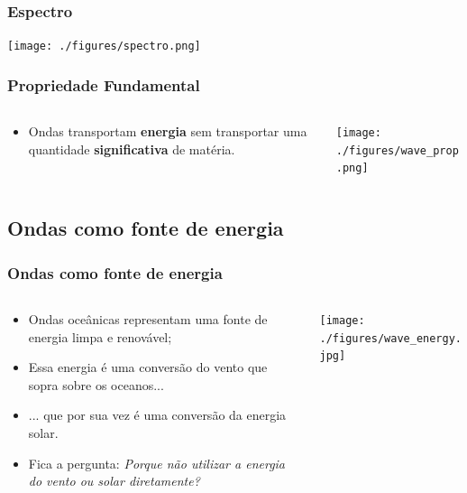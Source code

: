 \begin{frame}
    \frametitle{Espectro}
    \begin{center}
        \texttt{[image: ./figures/spectro.png]}
    \end{center}
\end{frame}

\begin{frame}
    \frametitle{Propriedade Fundamental}
    \begin{columns}
        \begin{column}{0.5\textwidth}
            \begin{itemize}[<+-| alert@+>]
                \item Ondas transportam {\bf energia} sem transportar uma
                      quantidade {\bf significativa} de matéria.
            \end{itemize}
            \vspace*{3cm}
        \end{column}
        \begin{column}{0.5\textwidth}
            \begin{center}
                \texttt{[image: ./figures/wave\_prop.png]}
            \end{center}
        \end{column}
    \end{columns}
\end{frame}

\subsection{Ondas como fonte de energia}
\begin{frame}
    \frametitle{Ondas como fonte de energia}
    \begin{columns}
        \begin{column}{0.5\textwidth}
        \small{
            \begin{itemize}[<+-| alert@+>]
                \item Ondas oceânicas representam uma fonte de energia limpa e
                      renovável;
                \item Essa energia é uma conversão do vento que sopra sobre os
                      oceanos...
                \item ... que por sua vez é uma conversão da energia solar.
                \item Fica a pergunta: {\it Porque não utilizar a energia do
                     vento ou solar diretamente?}
            \end{itemize}
            }
        \end{column}
        \begin{column}{0.5\textwidth}
            \begin{center}
                \texttt{[image: ./figures/wave\_energy.jpg]}
            \end{center}
        \end{column}
    \end{columns}
\end{frame}

